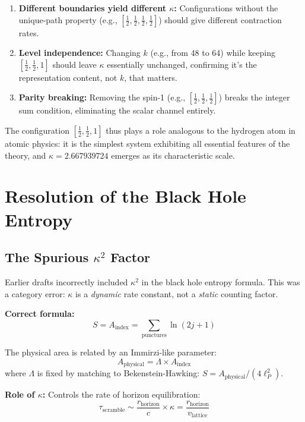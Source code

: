 \documentclass[11pt]{article}
\begin{document}
\begin{enumerate}
  \item \textbf{Different boundaries yield different $\kappa$:} Configurations without the unique-path property (e.g., $[\frac{1}{2}, \frac{1}{2}, \frac{1}{2}, \frac{1}{2}]$) should give different contraction rates.

  \item \textbf{Level independence:} Changing $k$ (e.g., from 48 to 64) while keeping $[\frac{1}{2}, \frac{1}{2}, 1]$ should leave $\kappa$ essentially unchanged, confirming it's the representation content, not $k$, that matters.

  \item \textbf{Parity breaking:} Removing the spin-1 (e.g., $[\frac{1}{2}, \frac{1}{2}, \frac{1}{2}]$) breaks the integer sum condition, eliminating the scalar channel entirely.
\end{enumerate}

The configuration $[\frac{1}{2}, \frac{1}{2}, 1]$ thus plays a role analogous to the hydrogen atom in atomic physics: it is the simplest system exhibiting all essential features of the theory, and $\kappa = 2.667939724$ emerges as its characteristic scale.

\section{Resolution of the Black Hole Entropy}

\subsection{The Spurious $\kappa^2$ Factor}

Earlier drafts incorrectly included $\kappa^2$ in the black hole entropy formula. This was a category error: $\kappa$ is a \emph{dynamic} rate constant, not a \emph{static} counting factor.

\textbf{Correct formula:}
\[
  S = A_{\text{index}} = \sum_{\text{punctures}} \ln(2j + 1)
\]

The physical area is related by an Immirzi-like parameter:
\[
  A_{\text{physical}} = \Lambda \times A_{\text{index}}
\]
where $\Lambda$ is fixed by matching to Bekenstein-Hawking: $S = A_{\text{physical}}/(4\ell_P^2)$.

\textbf{Role of $\kappa$:} Controls the rate of horizon equilibration:
\[
  \tau_{\text{scramble}} \sim \frac{r_{\text{horizon}}}{c} \times \kappa = \frac{r_{\text{horizon}}}{v_{\text{lattice}}}
\]
\end{document}
